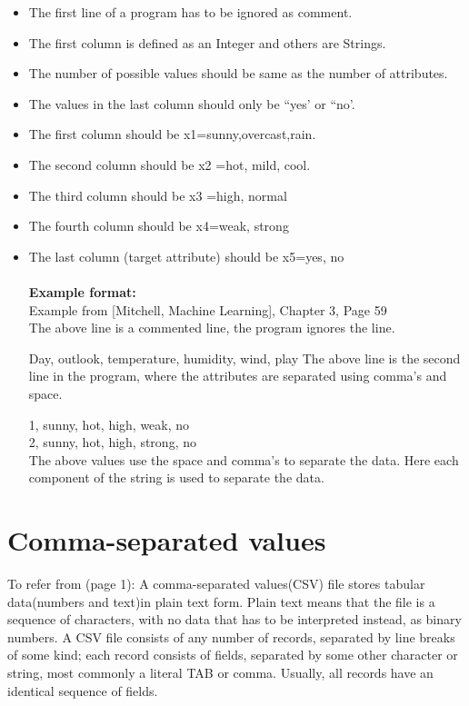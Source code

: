 \documentclass{report}
\begin{document}
\begin{itemize}

\item The first line of a program has to be ignored as comment.
\item The first column is defined as an Integer and others are Strings.
\item The number of possible values should be same as the number of attributes.
\item The values in the last column should only be ``yes' or ``no'.
\item The first column should be x1={sunny,overcast,rain}.
\item The second column should be x2 ={hot, mild, cool}.
\item The third column should be x3 ={high, normal}
\item The fourth column should be x4={weak, strong}
\item The last column (target attribute) should be x5={yes, no}\\\\


{\bf Example format:}\\
Example from [Mitchell, Machine Learning], Chapter 3, Page 59\\
The above line is a commented line, the program ignores the line.

Day, outlook, temperature, humidity, wind, play
The above line is the second line in the program, where the attributes are separated using comma's and space. 
 
1, sunny, hot, high, weak, no\\
2, sunny, hot, high, strong, no\\

The above values use the space and comma's to separate the data. Here each component of the string is used to separate the data.


\end{itemize}


\section{Comma-separated values}
\label{sec:csv}

To refer from \cite{Wikipedia_CommaSeparatedValues}(page 1): A comma-separated values(CSV) file stores tabular data(numbers and text)in plain text form. Plain text means that the file is a sequence of characters, with no data that has to be interpreted instead, as binary numbers. A CSV file consists of any number of records, separated by line breaks of some kind; each record consists of fields, separated by some other character or string, most commonly a literal TAB or comma. Usually, all records have an identical sequence of fields.
\end{document}
